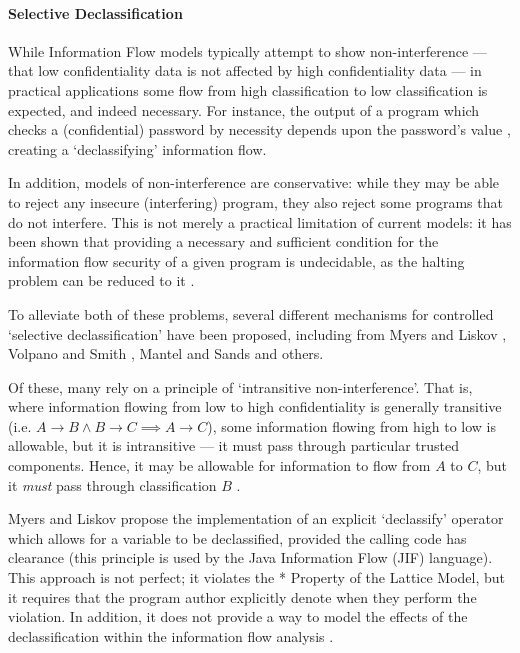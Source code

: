 	\paragraph{Selective Declassification}
	
	While Information Flow models typically attempt to show non-interference --- that low confidentiality data is not affected by high confidentiality data --- in practical applications some flow from high classification to low classification is expected, and indeed necessary. For instance, the output of a program which checks a (confidential) password by necessity depends upon the password's value \cite{sabelfeld2003if}, creating a `declassifying' information flow.
	
	In addition, models of non-interference are conservative: while they may be able to reject any insecure (interfering) program, they also reject some programs that do not interfere. This is not merely a practical limitation of current models: it has been shown that providing a necessary and sufficient condition for the information flow security of a given program is undecidable, as the halting problem can be reduced to it \cite{denning1977if}.
	
	To alleviate both of these problems, several different mechanisms for controlled `selective declassification' have been proposed, including from Myers and Liskov \cite{myers1997if}, Volpano and Smith \cite{volpano2000declassification}, Mantel and Sands \cite{mantel2004controlled} and others.
	
	Of these, many rely on a principle of `intransitive non-interference'. That is, where information flowing from low to high confidentiality is generally transitive (i.e. $ A \rightarrow B \wedge B \rightarrow C \implies A \rightarrow C $), some information flowing from high to low is allowable, but it is intransitive --- it must pass through particular trusted components. Hence, it may be allowable for information to flow from $ A $ to $ C $, but it \textit{must} pass through classification $ B $ \cite{roscoe1999intransitive}.
	
	Myers and Liskov \cite{myers1997if} propose the implementation of an explicit `declassify' operator which allows for a variable to be declassified, provided the calling code has clearance (this principle is used by the Java Information Flow (JIF) language). This approach is not perfect; it violates the * Property of the Lattice Model, but it requires that the program author explicitly denote when they perform the violation. In addition, it does not provide a way to model the effects of the declassification within the information flow analysis  \cite{zdancewic2004challenges}.
	
